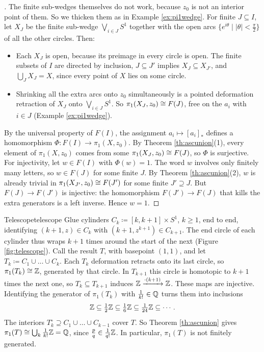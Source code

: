 \begin{proof}[]
  The finite sub-wedges themselves do not work, because $z_0$ is not an interior point of them. So we thicken them as in Example \ref{ex:pi1wedge}. For finite $J\subseteq I$, let $X_J$ be the finite sub-wedge $\bigvee_{i\in J}S^1$ together with the open arcs $\{e^{i\theta}\mid\lvert\theta\rvert<\frac\pi2\}$ of all the other circles. Then:
  \begin{itemize}
    \item Each $X_J$ is open, because its preimage in every circle is open. The finite subsets of $I$ are directed by inclusion, $J\subseteq J'$ implies $X_J\subseteq X_{J'}$, and $\bigcup_J X_J=X$, since every point of $X$ lies on some circle.
    \item Shrinking all the extra arcs onto $z_0$ simultaneously is a pointed deformation retraction of $X_J$ onto $\bigvee_{i\in J}S^1$. So $\pi_1(X_J,z_0)\cong F(J)$, free on the $a_i$ with $i\in J$ (Example \ref{ex:pi1wedge}).
  \end{itemize}
  By the universal property of $F(I)$, the assignment $a_i\mapsto[a_i]_*$ defines a homomorphism $\Phi:F(I)\to\pi_1(X,z_0)$. By Theorem \ref{th:ascunion}(1), every element of $\pi_1(X,z_0)$ comes from some $\pi_1(X_J,z_0)\cong F(J)$, so $\Phi$ is surjective. For injectivity, let $w\in F(I)$ with $\Phi(w)=1$. The word $w$ involves only finitely many letters, so $w\in F(J)$ for some finite $J$. By Theorem \ref{th:ascunion}(2), $w$ is already trivial in $\pi_1(X_{J'},z_0)\cong F(J')$ for some finite $J'\supseteq J$. But $F(J)\to F(J')$ is injective: the homomorphism $F(J')\to F(J)$ that kills the extra generators is a left inverse. Hence $w=1$.
\end{proof}

\begin{example}{Telescope}{telescope}
  Glue cylinders $C_k\coloneq[k,k+1]\times S^1$, $k\geq1$, end to end, identifying $(k+1,z)\in C_k$ with $(k+1,z^{k+1})\in C_{k+1}$. The end circle of each cylinder thus wraps $k+1$ times around the start of the next (Figure \ref{fig:telescope}). Call the result $T$, with basepoint $(1,1)$, and let $T_k\coloneq C_1\cup\dots\cup C_k$. Each $T_k$ deformation retracts onto its last circle, so $\pi_1(T_k)\cong\mathbb{Z}$, generated by that circle. In $T_{k+1}$ this circle is homotopic to $k+1$ times the next one, so $T_k\subseteq T_{k+1}$ induces $\mathbb{Z}\xrightarrow{\cdot(k+1)}\mathbb{Z}$. These maps are injective. Identifying the generator of $\pi_1(T_k)$ with $\frac1{k!}\in\mathbb{Q}$ turns them into inclusions \[
    \mathbb{Z}\subseteq\tfrac12\mathbb{Z}\subseteq\tfrac16\mathbb{Z}\subseteq\tfrac1{24}\mathbb{Z}\subseteq\cdots.
  \]
  The interiors $T_k^\circ\supseteq C_1\cup\dots\cup C_{k-1}$ cover $T$. So Theorem \ref{th:ascunion} gives $\pi_1(T)\cong\bigcup_k\frac1{k!}\mathbb{Z}=\mathbb{Q}$, since $\frac pq\in\frac1{q!}\mathbb{Z}$. In particular, $\pi_1(T)$ is not finitely generated.
\end{example}

